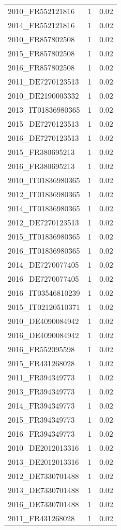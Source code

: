 \begin{table*}[htbp]
\begin{tabular}{lrr}
2010_FR552121816 & 1 & 0.02 \\
2014_FR552121816 & 1 & 0.02 \\
2010_FR857802508 & 1 & 0.02 \\
2015_FR857802508 & 1 & 0.02 \\
2016_FR857802508 & 1 & 0.02 \\
2011_DE7270123513 & 1 & 0.02 \\
2010_DE2190003332 & 1 & 0.02 \\
2013_IT01836980365 & 1 & 0.02 \\
2015_DE7270123513 & 1 & 0.02 \\
2016_DE7270123513 & 1 & 0.02 \\
2015_FR380695213 & 1 & 0.02 \\
2016_FR380695213 & 1 & 0.02 \\
2010_IT01836980365 & 1 & 0.02 \\
2012_IT01836980365 & 1 & 0.02 \\
2014_IT01836980365 & 1 & 0.02 \\
2012_DE7270123513 & 1 & 0.02 \\
2015_IT01836980365 & 1 & 0.02 \\
2016_IT01836980365 & 1 & 0.02 \\
2014_DE7270077405 & 1 & 0.02 \\
2016_DE7270077405 & 1 & 0.02 \\
2016_IT03546810239 & 1 & 0.02 \\
2015_IT02120510371 & 1 & 0.02 \\
2010_DE4090084942 & 1 & 0.02 \\
2016_DE4090084942 & 1 & 0.02 \\
2016_FR552095598 & 1 & 0.02 \\
2015_FR431268028 & 1 & 0.02 \\
2011_FR394349773 & 1 & 0.02 \\
2013_FR394349773 & 1 & 0.02 \\
2014_FR394349773 & 1 & 0.02 \\
2015_FR394349773 & 1 & 0.02 \\
2016_FR394349773 & 1 & 0.02 \\
2010_DE2012013316 & 1 & 0.02 \\
2013_DE2012013316 & 1 & 0.02 \\
2012_DE7330701488 & 1 & 0.02 \\
2013_DE7330701488 & 1 & 0.02 \\
2016_DE7330701488 & 1 & 0.02 \\
2011_FR431268028 & 1 & 0.02 \\

\end{tabular}
\end{table*}
